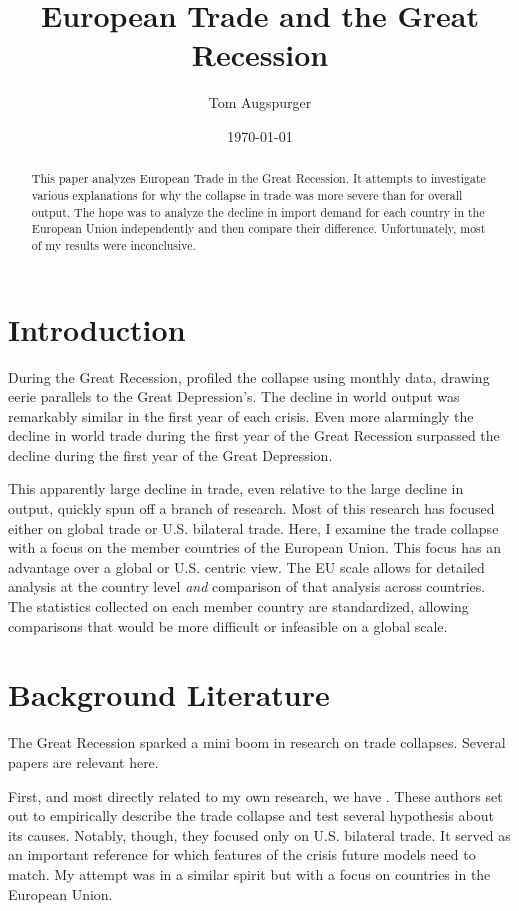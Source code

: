 \documentclass[11pt]{article}
\title{European Trade and the Great Recession}
\author{Tom Augspurger}
\date{\today}
\begin{document}
\maketitle
\begin{abstract}
  This paper analyzes European Trade in the Great Recession.  It attempts to investigate various explanations for why the collapse in trade was more severe than for overall output.  The hope was to analyze the decline in import demand for each country in the European Union independently and then compare their difference.  Unfortunately, most of my results were inconclusive.
\end{abstract}
\section{Introduction}
\label{sec:introduction}

  During the Great Recession, \cite{eichengreen_orourke:2010} profiled the collapse using monthly data, drawing eerie parallels to the Great Depression's.  The decline in world output was remarkably similar in the first year of each crisis.  Even more alarmingly the decline in world trade during the first year of the Great Recession surpassed the decline during the first year of the Great Depression.

  This apparently large decline in trade, even relative to the large decline in output, quickly spun off a branch of research.  Most of this research has focused either on global trade or U.S. bilateral trade.  Here, I examine the trade collapse with a focus on the member countries of the European Union.  This focus has an advantage over a global or U.S. centric view.  The EU scale allows for detailed analysis at the country level \emph{and} comparison of that analysis across countries. The statistics collected on each member country are standardized, allowing comparisons that would be more difficult or infeasible on a global scale.

\section{Background Literature}
\label{sec:background_literature}
  The Great Recession sparked a mini boom in research on trade collapses.  Several papers are relevant here. 

  First, and most directly related to my own research, we have \cite{llt:2010}.  These authors set out to empirically describe the trade collapse and test several hypothesis about its causes.  Notably, though, they focused only on U.S. bilateral trade.  It served as an important reference for which features of the crisis future models need to match.  My attempt was in a similar spirit but with a focus on countries in the European Union.
\end{document}

